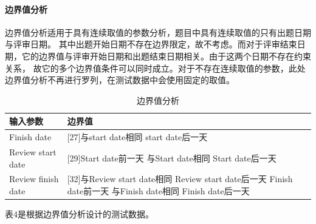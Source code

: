 \documentclass[hyperref, a4paper]{ctexart}
\let\oldparagraph\paragraph
\renewcommand{\paragraph}[1]{\oldparagraph{#1}\mbox{}}
\begin{document}
\begin{table}[!htbp]
\begin{tabular}{|p{0.35cm}|p{1.2cm}|p{0.22cm}|p{0.22cm}|p{0.22cm}|p{0.22cm}|p{0.22cm}|p{0.22cm}|p{0.9cm}|p{0.9cm}|p{0.9cm}|p{0.9cm}|p{0.22cm}|p{0.8cm}|}
  \hline
  \end{tabular}
\end{table}

\pagebreak

\hypertarget{ux8fb9ux754cux503cux5206ux6790}{%
\paragraph{边界值分析}\label{ux8fb9ux754cux503cux5206ux6790}}

边界值分析适用于具有连续取值的参数分析，题目中具有连续取值的只有出题日期与评审日期。
其中出题开始日期不存在边界限定，故不考虑。而对于评审结束日期，它的边界值与评审开始日期和出题结束日期相关。由于这两个日期不存在约束关系，
故它的多个边界值条件可以同时成立。对于不存在连续取值的参数，此处边界值分析不再进行罗列，在测试数据中会使用固定的取值。

\begin{table}[!htbp]
  \caption{边界值分析}
  \label{Tab:bookRWCal}
  \centering
  \begin{tabular}{|p{6.0cm}|p{6.5cm}|}
  \hline
  \textbf{输入参数} &\textbf{边界值} \\
  \hline
  Finish date     & [27]与start date相同   \newline [28] start date后一天 \\
  \hline
  Review start date     & [29]Start date前一天     \newline [30]与Start date相同  \newline  [31]Start date后一天 \\
  \hline
  Review finish date     & [32]与Review start date相同     \newline [33]Review start date后一天 \newline [34]Finish date前一天 \newline [35]与Finish date相同  \newline  [36]Finish date后一天\\
  \hline
  \end{tabular}
\end{table}

表4是根据边界值分析设计的测试数据。
\end{document}
